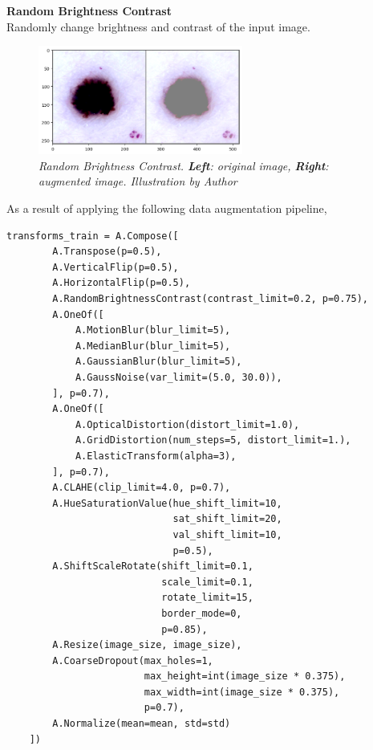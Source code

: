 \newpage

\textbf{Random Brightness Contrast} \\

Randomly change brightness and contrast of the input image.

\begin{figure}[H]
  \centering
  \includegraphics[width=0.6\textwidth]{imatges/methodological_contribution/random-brigness-constrast.png}
  \caption[Random Brightness Contrast]{\textit{Random Brightness Contrast. \textbf{Left}: original image, \textbf{Right}: augmented image. Illustration by Author}}
\end{figure}

As a result of applying the following data augmentation pipeline,

\begin{Verbatim}[fontsize=\scriptsize]
    transforms_train = A.Compose([
        A.Transpose(p=0.5),
        A.VerticalFlip(p=0.5),
        A.HorizontalFlip(p=0.5),
        A.RandomBrightnessContrast(contrast_limit=0.2, p=0.75),
        A.OneOf([
            A.MotionBlur(blur_limit=5),
            A.MedianBlur(blur_limit=5),
            A.GaussianBlur(blur_limit=5),
            A.GaussNoise(var_limit=(5.0, 30.0)),
        ], p=0.7),
        A.OneOf([
            A.OpticalDistortion(distort_limit=1.0),
            A.GridDistortion(num_steps=5, distort_limit=1.),
            A.ElasticTransform(alpha=3),
        ], p=0.7),
        A.CLAHE(clip_limit=4.0, p=0.7),
        A.HueSaturationValue(hue_shift_limit=10,
                             sat_shift_limit=20,
                             val_shift_limit=10,
                             p=0.5),
        A.ShiftScaleRotate(shift_limit=0.1,
                           scale_limit=0.1,
                           rotate_limit=15,
                           border_mode=0,
                           p=0.85),
        A.Resize(image_size, image_size),
        A.CoarseDropout(max_holes=1,
                        max_height=int(image_size * 0.375),
                        max_width=int(image_size * 0.375),
                        p=0.7),
        A.Normalize(mean=mean, std=std)
    ])
\end{Verbatim}

